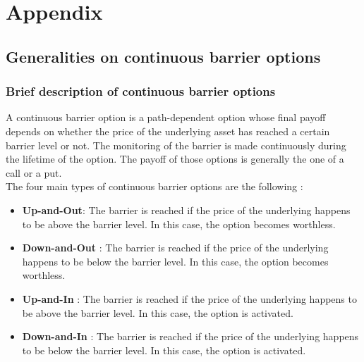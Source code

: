 \documentclass[a4paper,11pt,english]{book}
\let\cleardoublepage\clearpage
\begin{document}
\newpage
\begingroup
\let\clearpage\relax
\let\cleardoublepage\relax


\renewcommand{\thesection}{\Alph{section}}
\chapter*{Appendix}
\appendix
{}

\section{Generalities on continuous barrier options}
\label{appendix:down-in-put}

\subsection{Brief description of continuous barrier options}
A continuous barrier option is a path-dependent option whose final payoff depends on whether the price of the underlying asset has reached a certain barrier level or not. The monitoring of the barrier is made continuously during the lifetime of the option. The payoff of those options is generally the one of a call or a put.\\

The four main types of continuous barrier options are the following :
\begin{itemize}
    \item \textbf{Up-and-Out}: The barrier is reached if the price of the underlying happens to be above the barrier level. In this case, the option becomes worthless.
    \item \textbf{Down-and-Out} : The barrier is reached if the price of the underlying happens to be below the barrier level. In this case, the option becomes worthless.
    \item \textbf{Up-and-In} : The barrier is reached if the price of the underlying happens to be above the barrier level. In this case, the option is activated.
    \item \textbf{Down-and-In} : The barrier is reached if the price of the underlying happens to be below the barrier level. In this case, the option is activated.
\end{itemize}
\end{document}

